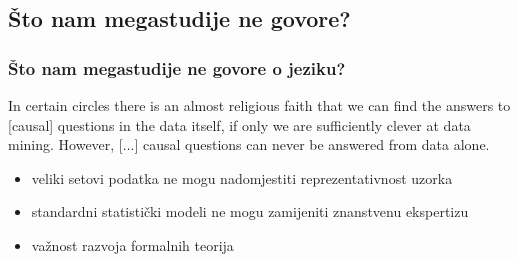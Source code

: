 \documentclass{beamer}
\newcommand{\tinycitep}[1]{%
    \bgroup
    \scriptsize
    \citep{#1}
    \egroup}
\begin{document}
\subsection{Što nam megastudije ne govore?}

\begin{frame}
    \frametitle{Što nam megastudije ne govore o jeziku?}

    \hspace*{\fill}
    \raisebox{37.4pt}{
        \begin{minipage}[t]{1em}
            \fontsize{56}{66}\selectfont
            \bfseries
            ,,
        \end{minipage}
    }
    \begin{minipage}{24em}
        In certain circles there is an almost religious faith that we can find
        the answers to [causal] questions in the data itself, if only we are
        sufficiently clever at data mining. However, [...] causal questions
        can never be answered from data alone.

        \bigskip

        \raggedleft
        \scriptsize
        \citet[str. 351]{pearlBookWhyNew2018}
    \end{minipage}
    \hspace*{\fill}

\end{frame}

\begin{frame}
    \begin{itemize}
        \item veliki setovi podatka ne mogu nadomjestiti reprezentativnost
            uzorka \tinycitep{mengStatisticalParadisesParadoxes2018}

        \pause

        \item standardni statistički modeli ne mogu zamijeniti znanstvenu
            ekspertizu
            \bgroup
            \scriptsize
            \citep[str. 526]{mcelreathStatisticalRethinkingBayesian2020}
            \egroup

        \pause

        \item važnost razvoja formalnih teorija
            \tinycitep{fiedlerToolsToysTruisms2004,
            navarroIfMathematicalPsychology2020,navarroDevilDeepBlue2019}
    \end{itemize}
\end{frame}
\end{document}
